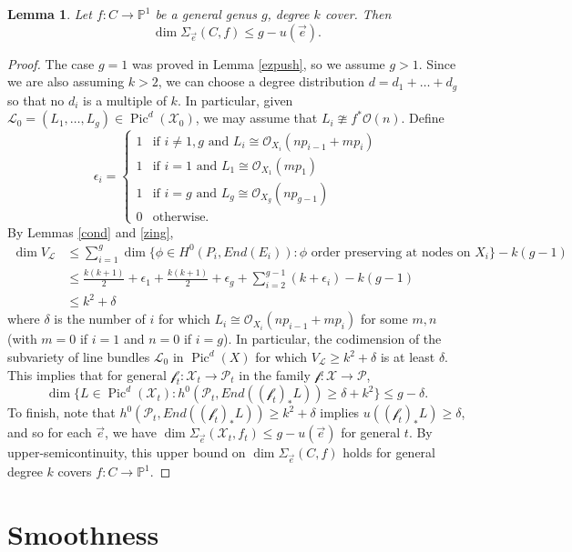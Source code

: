 \documentclass[12pt]{amsart}
\newcommand{\pp}{\mathbb{P}}
\renewcommand{\P}{\mathcal{P}}
\renewcommand{\L}{\mathcal{L}}
\newcommand{\X}{\mathcal{X}}
\renewcommand{\O}{\mathscr{O}}
\newcommand{\f}{\mathcal{f}}
\newtheorem{Lemma}[theorem]{Lemma}
\DeclareMathOperator{\Pic}{Pic}
\newcommand{\e}{\vec{e}}
\theoremstyle{definition}
\theoremstyle{remark}
\theoremstyle{remark}
\numberwithin{equation}{section}
\begin{document}
\begin{Lemma} \label{dimbound}
Let $f\colon  C \rightarrow \pp^1$ be a general genus $g$, degree $k$ cover. Then
\[\dim \Sigma_{\vec{e}}(C, f) \leq g - u(\vec{e}).\]
\end{Lemma}
\begin{proof}
The case $g = 1$ was proved in Lemma \ref{ezpush}, so we assume $g > 1$. Since we are also assuming $k > 2$, we can choose a degree distribution $d = d_1 + \ldots + d_g$ so that no $d_i$ is a multiple of $k$. In particular, given $\L_0 = (L_1, \ldots, L_g) \in \Pic^d(\X_0)$, we may assume that $L_i \ncong f^*\O(n)$.
Define
\[\epsilon_i = \begin{cases} 1 & \text{if $i \neq 1, g$ and $L_i \cong  \O_{X_i}(np_{i-1} + mp_i)$} \\ 1 & \text{if $i = 1$ and $L_1 \cong \O_{X_1}(mp_1)$} \\ 1 & \text{if $i = g$ and $L_g \cong \O_{X_g}(np_{g-1})$} \\ 0 &\text{otherwise.} \end{cases}\]
By Lemmas \ref{cond} and \ref{zing},
\begin{align*}
\dim V_{\L} &\leq \sum_{i=1}^g \dim \{\phi \in H^0(P_i, End(E_i)) : \phi \text{ order preserving at nodes on $X_i$}\} - k(g-1) \\
&\leq \frac{k(k+1)}{2} +\epsilon_1 + \frac{k(k+1)}{2} +\epsilon_g + \sum_{i=2}^{g-1} (k + \epsilon_i ) - k(g-1)\\
&\leq k^2 + \delta
\end{align*}
where $\delta$ is the number of $i$ for which $L_i \cong \O_{X_i}(np_{i-1} + mp_{i})$ for some $m, n$ (with $m = 0$ if $i = 1$ and $n = 0$ if $i = g$).  In particular, the codimension of the subvariety of line bundles $\L_0$ in $\Pic^d(X)$ for which $V_{\L} \geq k^2 + \delta$ is at least $\delta$. This implies that for general $\f_t: \X_t \rightarrow \P_t$ in the family $\f\colon  \X \rightarrow \P$, 
\[\dim\{L \in \Pic^d(\X_t) : h^0(\P_t, End((\f_t)_*L)) \geq \delta +k^2\} \leq g - \delta.\]
To finish, note that $h^0(\P_t, End((\f_t)_*L)) \geq k^2+\delta$ implies $u((\f_t)_*L) \geq \delta$, and so for each $\vec{e}$, we have $\dim \Sigma_{\e}(\X_t, f_t) \leq g - u(\vec{e})$ for general $t$. By upper-semicontinuity, this upper bound on $\dim \Sigma_{\vec{e}}(C, f)$ holds for general degree $k$ covers $f\colon  C \rightarrow \pp^1$.
\end{proof}

 
 \section{Smoothness} \label{smoothness}
\end{document}
